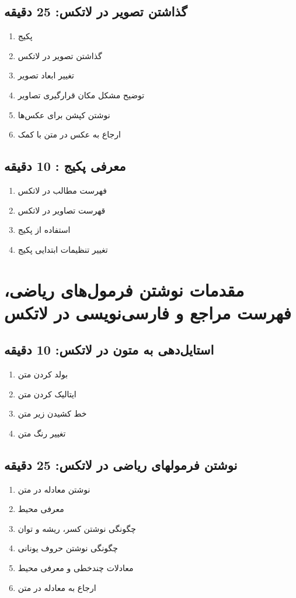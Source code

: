 \documentclass{article}
\begin{document}
\subsection*{گذاشتن تصویر در لاتکس: 25 دقیقه}
\begin{enumerate}
\item پکیج 
\item گذاشتن تصویر در لاتکس
\item تغییر ابعاد تصویر
\item توضیح مشکل مکان قرارگیری تصاویر 
\item نوشتن کپشن برای عکس‌ها
\item ارجاع به عکس در متن با کمک 
\end{enumerate}
\subsection*{معرفی پکیج : 10 دقیقه}
\begin{enumerate}
\item فهرست مطالب در لاتکس
\item قهرست تصاویر در لاتکس
\item استفاده از پکیج 
\item تغییر تنظیمات ابتدایی پکیج  
\end{enumerate}

\section{مقدمات نوشتن فرمول‌های ریاضی، فهرست مراجع و فارسی‌نویسی در لاتکس}
\subsection*{استایل‌دهی به متون در لاتکس: 10 دقیقه}
\begin{enumerate}
\item بولد کردن متن
\item ایتالیک کردن متن
\item خط کشیدن زیر متن
\item تغییر رنگ متن
\end{enumerate}
\subsection*{نوشتن فرمولهای ریاضی در لاتکس: 25 دقیقه}
\begin{enumerate}
\item نوشتن معادله در متن
\item معرفی محیط 
\item چگونگی نوشتن کسر، ریشه و توان
\item چگونگی نوشتن حروف یونانی
\item معادلات چندخطی و معرفی محیط 
\item ارجاع به معادله در متن
\end{enumerate}
\end{document}
